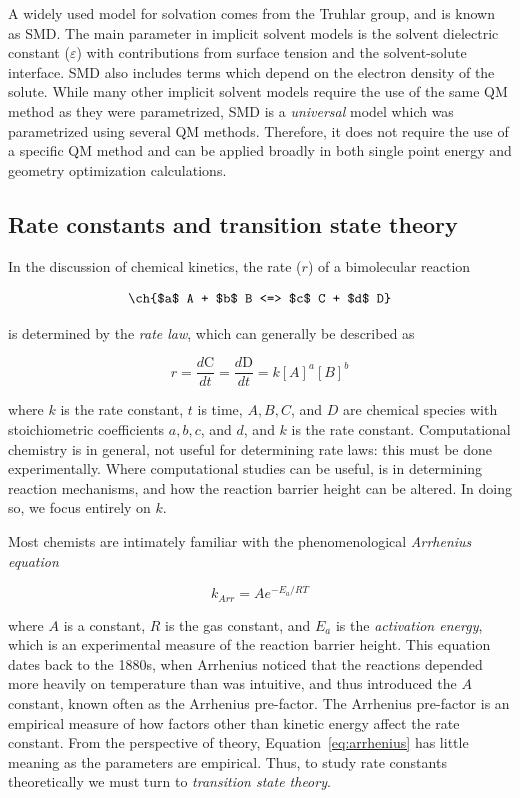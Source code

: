 A widely used model for solvation comes from the Truhlar group, and is known as
SMD.\cite{Marenich2009} The main parameter in implicit solvent models is the
solvent dielectric constant ($\varepsilon$) with contributions from surface
tension and the solvent-solute interface. SMD also includes terms which depend
on the electron density of the solute.  While many other implicit solvent
models require the use of the same QM method as they were
parametrized,\cite{Ho2010} SMD is a \emph{universal} model which was
parametrized using several QM methods. Therefore, it does not require the use
of a specific QM method and can be applied broadly in both single point energy
and geometry optimization calculations.

\subsection{Rate constants and transition state theory}

In the discussion of chemical kinetics, the rate ($r$) of a bimolecular
reaction

\begin{equation}
  \ch{$a$ A + $b$ B <=> $c$ C + $d$ D}
  \label{eq:a}
\end{equation}

\noindent is determined by the \emph{rate law}, which can generally be
described as

\begin{equation}
  r = \frac{d \text{C}}{dt} =\frac{d \text{D}}{dt} = k[A]^a [B]^b
\end{equation}

\noindent where $k$ is the rate constant, $t$ is time, $A, B, C$, and $D$ are
chemical species with stoichiometric coefficients $a, b, c$, and $d$, and $k$
is the rate constant. Computational chemistry is in general, not useful for
determining rate laws: this must be done experimentally. Where computational
studies can be useful, is in determining reaction mechanisms, and how the
reaction barrier height can be altered. In doing so, we focus entirely on $k$.

Most chemists are intimately familiar with the phenomenological \emph{Arrhenius
equation}

\begin{equation}
  k_{Arr} = Ae^{-E_a/RT}
\label{eq:arrhenius}
\end{equation}

\noindent where $A$ is a constant, $R$ is the gas constant, and $E_a$ is the
\emph{activation energy}, which is an experimental measure of the reaction
barrier height. This equation dates back to the 1880s, when Arrhenius noticed
that the reactions depended more heavily on temperature than was intuitive, and
thus introduced the $A$ constant, known often as the Arrhenius
pre-factor.\cite{McQuarrie1997} The Arrhenius pre-factor is an empirical
measure of how factors other than kinetic energy affect the rate constant. From
the perspective of theory, Equation~\ref{eq:arrhenius} has little meaning as
the parameters are empirical. Thus, to study rate constants theoretically we
must turn to \emph{transition state theory}.

